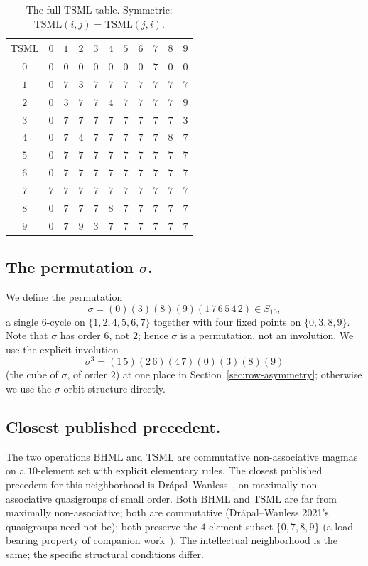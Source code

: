 \documentclass[11pt,reqno]{amsart}
\theoremstyle{plain}
\theoremstyle{definition}
\theoremstyle{remark}
\newcommand{\TS}{\mathrm{TSML}}
\newcommand{\BH}{\mathrm{BHML}}
\newcommand{\sig}{\sigma}
\begin{document}
\begin{table}[h]
\caption{The full $\TS$ table. Symmetric: $\TS(i, j) = \TS(j, i)$.}
\label{tab:TS}
\centering
\begin{tabular}{c|cccccccccc}
$\TS$ & $0$ & $1$ & $2$ & $3$ & $4$ & $5$ & $6$ & $7$ & $8$ & $9$ \\ \hline
$0$ & $0$ & $0$ & $0$ & $0$ & $0$ & $0$ & $0$ & $7$ & $0$ & $0$ \\
$1$ & $0$ & $7$ & $3$ & $7$ & $7$ & $7$ & $7$ & $7$ & $7$ & $7$ \\
$2$ & $0$ & $3$ & $7$ & $7$ & $4$ & $7$ & $7$ & $7$ & $7$ & $9$ \\
$3$ & $0$ & $7$ & $7$ & $7$ & $7$ & $7$ & $7$ & $7$ & $7$ & $3$ \\
$4$ & $0$ & $7$ & $4$ & $7$ & $7$ & $7$ & $7$ & $7$ & $8$ & $7$ \\
$5$ & $0$ & $7$ & $7$ & $7$ & $7$ & $7$ & $7$ & $7$ & $7$ & $7$ \\
$6$ & $0$ & $7$ & $7$ & $7$ & $7$ & $7$ & $7$ & $7$ & $7$ & $7$ \\
$7$ & $7$ & $7$ & $7$ & $7$ & $7$ & $7$ & $7$ & $7$ & $7$ & $7$ \\
$8$ & $0$ & $7$ & $7$ & $7$ & $8$ & $7$ & $7$ & $7$ & $7$ & $7$ \\
$9$ & $0$ & $7$ & $9$ & $3$ & $7$ & $7$ & $7$ & $7$ & $7$ & $7$ \\
\end{tabular}
\end{table}

\subsection*{The permutation $\sig$.}

We define the permutation
\[
  \sig = (0)(3)(8)(9)(1\,7\,6\,5\,4\,2) \in S_{10},
\]
a single $6$-cycle on $\{1, 2, 4, 5, 6, 7\}$ together with four
fixed points on $\{0, 3, 8, 9\}$. Note that $\sig$ has order
$6$, not $2$; hence $\sig$ is a permutation, not an
involution. We use the explicit involution
\[
  \sig^3 = (1\,5)(2\,6)(4\,7)(0)(3)(8)(9)
\]
(the cube of $\sig$, of order $2$) at one place in
Section~\ref{sec:row-asymmetry}; otherwise we use the
$\sig$-orbit structure directly.

\subsection*{Closest published precedent.}

The two operations $\BH$ and $\TS$ are commutative non-associative
magmas on a $10$-element set with explicit elementary rules. The
closest published precedent for this neighborhood is
Dr\'apal--Wanless~\cite{DrapalWanless2021}, on maximally
non-associative quasigroups of small order. Both $\BH$ and $\TS$
are far from maximally non-associative; both are commutative
(Dr\'apal--Wanless 2021's quasigroups need not be); both
preserve the $4$-element subset $\{0, 7, 8, 9\}$ (a load-bearing
property of companion work~\cite{FourCore}). The intellectual
neighborhood is the same; the specific structural conditions
differ.
\end{document}
